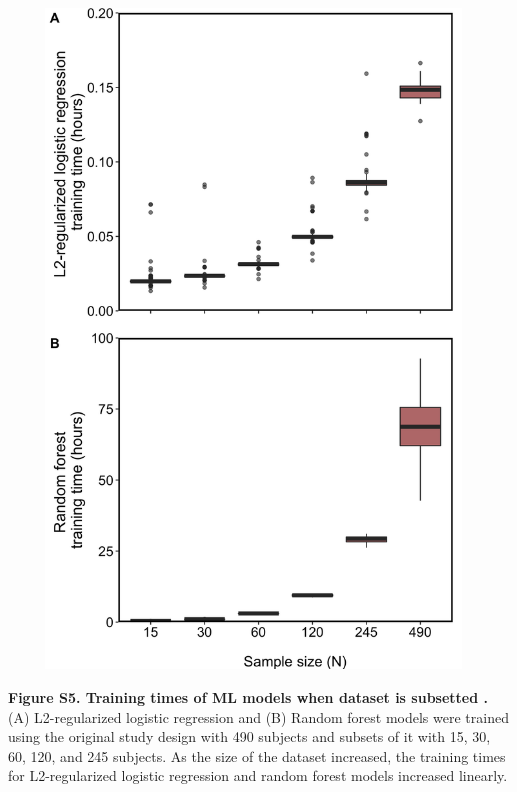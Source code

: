 \documentclass[11pt,]{article}
\begin{document}
\includegraphics[height=17.5cm, width=13cm]{Figure_S5.png}

\textbf{Figure S5. Training times of ML models when dataset is subsetted
.} (A) L2-regularized logistic regression and (B) Random forest models
were trained using the original study design with 490 subjects and
subsets of it with 15, 30, 60, 120, and 245 subjects. As the size of the
dataset increased, the training times for L2-regularized logistic
regression and random forest models increased linearly.

\newpage

\captionsetup{labelformat=empty}
\small
\end{document}
